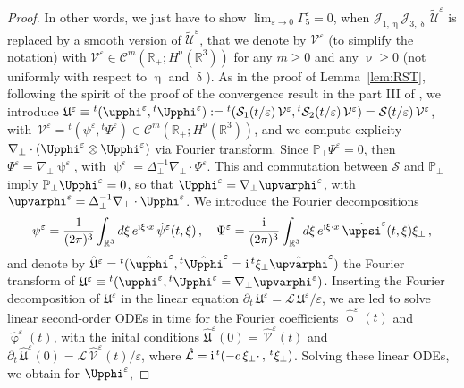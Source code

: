 \documentclass[11pt,reqno]{amsart}
\def \R{{\mathbb{R}}}
\def \P{{\mathbb{P}}}
\begin{document}
\begin{proof}
In other words, we just have to show $\lim_{\varepsilon \rightarrow 0}\Gamma_5^\varepsilon  =0$, when $ \mathcal J_{1,\upeta} \mathcal J_{3,\updelta} \,\widetilde{\mathcal U}^\varepsilon$ is replaced by a smooth version of $\widetilde{\mathcal U}^\varepsilon$, that we denote by ${\mathcal V}^\varepsilon$ (to simplify the notation) with $ {\mathcal V}^\varepsilon \in \mathscr{C}^m(\R_+; H^\upnu(\R^3))$ for any $m\geq 0$ and any $\upnu \geq 0$ (not uniformly with respect to $\upeta$ and $\updelta$). As in the proof of Lemma~\ref{lem:RST}, following the spirit of the proof of the convergence result in the part III of \cite{LM98}, we introduce $\mathfrak U^\varepsilon \equiv {}^t(\upphi^\varepsilon, {}^t \Upphi^\varepsilon) := {}^t(\mathcal S_1(t/\varepsilon) \, \mathcal V^\varepsilon,{}^t\mathcal S_2(t/\varepsilon) \, \mathcal V^\varepsilon) = \mathcal S(t/\varepsilon) \, \mathcal V^\varepsilon$, with $\, \mathcal V^\varepsilon = {}^t(\psi^\varepsilon,{}^t \Psi^\varepsilon)\in \mathscr{C}^m(\R_+; H^\upnu(\R^3))$, and we compute explicity $\nabla_\perp \cdot( \Upphi^\varepsilon \otimes  \Upphi^\varepsilon)$ via Fourier transform. Since $\P_\perp\Psi^\varepsilon=0$, then $\Psi^\varepsilon =\nabla_\perp \uppsi^\varepsilon$, with $\uppsi^\varepsilon = \Delta_\perp^{-1}\nabla_\perp \cdot \Psi^\varepsilon$. This and commutation between $\mathcal S$ and $\P_\perp$ imply $\P_\perp\Upphi^\varepsilon=0 $, so that $\Upphi^\varepsilon =\nabla_\perp \upvarphi^\varepsilon$, with $\upvarphi^\varepsilon = \Delta_\perp^{-1}\nabla_\perp \cdot \Upphi^\varepsilon$.  
We introduce the Fourier decompositions
\[
\psi^\varepsilon=\frac{1}{(2\pi)^3}\int_{\R^3}d\xi\, e^{{\rm i}\xi\cdot x} \,\hat \psi^\varepsilon(t,\xi) \,, \quad
\Psi^\varepsilon=\frac{{\rm i}}{(2\pi)^3}\int_{\R^3}d\xi\,  e^{{\rm i}\xi \cdot x}\, \hat \uppsi^\varepsilon(t,\xi) \xi_\perp \,, 
\]
and denote by $\hat{\mathfrak U}^\varepsilon={}^t(\hat \upphi^\varepsilon, {}^t \hat \Upphi^\varepsilon = {\rm i} \,{}^t  \xi_\perp \hat \upvarphi^\varepsilon)$ the Fourier transform of ${\mathfrak U}^\varepsilon \equiv {}^t(\upphi^\varepsilon, {}^t \Upphi^\varepsilon=\nabla_\perp \upvarphi^\varepsilon)$. Inserting  the Fourier decomposition  of $\mathfrak U^\varepsilon $ in the linear equation $\partial_t\,\mathfrak U^\varepsilon = \mathcal L\, \mathfrak U^\varepsilon/\varepsilon $, we are  led to solve linear second-order ODEs in time for the Fourier coefficients $\hat\upphi^\varepsilon(t)$ and  $\hat \upvarphi^\varepsilon(t)$, with the inital conditions $\hat{\mathfrak U} ^\varepsilon(0)= \, \hat{\mathcal V}^\varepsilon(t)$  and $\partial_t\,\hat {\mathfrak U}^\varepsilon(0)= \hat{\mathcal L} \, \hat{\mathcal V}^\varepsilon(t)/\varepsilon $, where $\hat{\mathcal L} = {\rm i}\, {}^t(-c \, \xi_\perp \cdot\, ,\, {}^t \xi_\perp)$. Solving these linear ODEs, we obtain for $\Upphi^\varepsilon$,

\end{proof}
\end{document}
